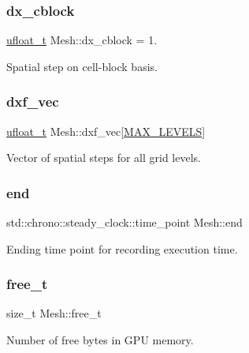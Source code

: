 \subsubsection{\texorpdfstring{dx\+\_\+cblock}{dx\_cblock}}
{\footnotesize\ttfamily \hyperlink{cppspec_8h_af529d360dfac9b9578aa719418a53a21}{ufloat\+\_\+t} Mesh\+::dx\+\_\+cblock = 1.}



Spatial step on cell-\/block basis. 

\mbox{\label{classMesh_a60333b1a7a0edd36b7826f70829b7627}} 
\subsubsection{\texorpdfstring{dxf\+\_\+vec}{dxf\_vec}}
{\footnotesize\ttfamily \hyperlink{cppspec_8h_af529d360dfac9b9578aa719418a53a21}{ufloat\+\_\+t} Mesh\+::dxf\+\_\+vec\mbox{[}\hyperlink{cppspec_8h_add784659439a8dd6b1423406171414d3}{M\+A\+X\+\_\+\+L\+E\+V\+E\+LS}\mbox{]}}



Vector of spatial steps for all grid levels. 

\mbox{\label{classMesh_a415e46ae484ff88e5f23871c79285ad9}} 
\subsubsection{\texorpdfstring{end}{end}}
{\footnotesize\ttfamily std\+::chrono\+::steady\+\_\+clock\+::time\+\_\+point Mesh\+::end}



Ending time point for recording execution time. 

\mbox{\label{classMesh_ac90298b2c95c119f4c5e74245710214d}} 
\subsubsection{\texorpdfstring{free\+\_\+t}{free\_t}}
{\footnotesize\ttfamily size\+\_\+t Mesh\+::free\+\_\+t}



Number of free bytes in G\+PU memory. 

